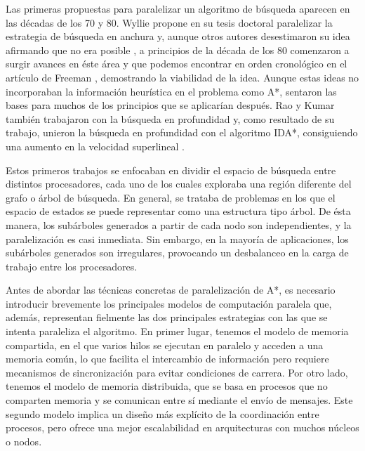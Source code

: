 \documentclass[a4paper,12pt]{article}
\begin{document}
Las primeras propuestas para paralelizar un algoritmo de búsqueda aparecen en las décadas de los 70 y 80. Wyllie \cite{wyllie1979complexity} propone en su tesis doctoral paralelizar la estrategia de búsqueda en anchura y, aunque otros autores desestimaron su idea afirmando que no era posible \cite{eckstein1977parallel, reghbati1978parallel, reif1985depth}, a principios de la década de los 80 comenzaron a surgir avances en éste área y que podemos encontrar en orden cronológico en el artículo de Freeman \cite{freeman1991parallel}, demostrando la viabilidad de la idea. Aunque estas ideas no incorporaban la información heurística en el problema como A*, sentaron las bases para muchos de los principios que se aplicarían después. Rao y Kumar \cite{rao1987parallel, kumar1987parallel} también trabajaron con la búsqueda en profundidad y, como resultado de su trabajo, unieron la búsqueda en profundidad con el algoritmo IDA*, consiguiendo una aumento en la velocidad superlineal \cite{rao1988superlinear}. 

Estos primeros trabajos se enfocaban en dividir el espacio de búsqueda entre distintos procesadores, cada uno de los cuales exploraba una región diferente del grafo o árbol de búsqueda. En general, se trataba de problemas en los que el espacio de estados se puede representar como una estructura tipo árbol. De ésta manera, los subárboles generados a partir de cada nodo son independientes, y la paralelización es casi inmediata. Sin embargo, en la mayoría de aplicaciones, los subárboles generados son irregulares, provocando un desbalanceo en la carga de trabajo entre los procesadores.

Antes de abordar las técnicas concretas de paralelización de A*, es necesario introducir brevemente los principales modelos de computación paralela que, además, representan fielmente las dos principales estrategias con las que se intenta paraleliza el algoritmo. En primer lugar, tenemos el modelo de memoria compartida, en el que varios hilos se ejecutan en paralelo y acceden a una memoria común, lo que facilita el intercambio de información pero requiere mecanismos de sincronización para evitar condiciones de carrera. Por otro lado, tenemos el modelo de memoria distribuida, que se basa en procesos que no comparten memoria y se comunican entre sí mediante el envío de mensajes. Este segundo modelo implica un diseño más explícito de la coordinación entre procesos, pero ofrece una mejor escalabilidad en arquitecturas con muchos núcleos o nodos.
\end{document}
